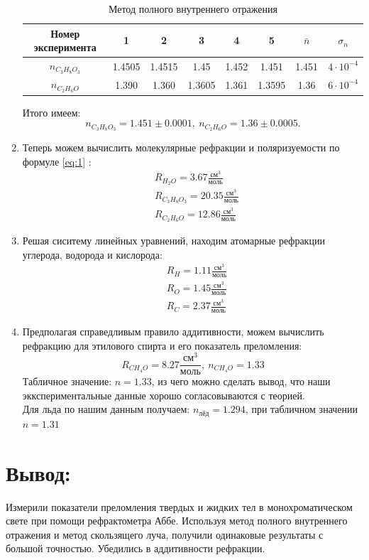 \documentclass[12pt]{article}
\begin{document}
\begin{enumerate}
    \begin{table}[h!]
        \centering
        \begin{tabular}{| c | c | c | c | c | c | c | c |} 
            \hline
            Номер эксперимента & 1 & 2 & 3 & 4 & 5 & $\bar{n}$ & $\sigma_n$ \\
            \hline
            $n_{C_3 H_8 O_3}$ & 1.4505 & 1.4515 & 1.45 & 1.452 & 1.451 &  1.451 & $4 \cdot 10^{-4}$ \\ 
            \hline
            $n_{C_2 H_6 O}$ & 1.390 & 1.360 & 1.3605 &  1.361  & 1.3595 & 1.36 & $6 \cdot 10^{-4}$ \\
            \hline
        \end{tabular}        
        \caption{Метод полного внутреннего отражения}
    \end{table}
    \newpage
    Итого имеем:
    \[ n_{C_3 H_8 O_3} = 1.451 \pm 0.0001, \ n_{C_2 H_6 O} = 1.36 \pm 0.0005. \]
    \item Теперь можем вычислить молекулярные рефракции и поляризуемости по формуле \eqref{eq:1} :
    \begin{align*}
        &R_{H_2 O} = 3.67 \frac{\text{см}^3}{\text{моль}} \\
        &R_{C_3 H_8 O_3} = 20.35 \frac{\text{см}^3}{\text{моль}} \\
        &R_{C_2 H_6 O} = 12.86 \frac{\text{см}^3}{\text{моль}}
    \end{align*}
    \item Решая сиситему линейных уравнений, находим атомарные рефракции углерода, водорода и кислорода: 
     \begin{align*}
        &R_{H} = 1.11 \frac{\text{см}^3}{\text{моль}} \\
        &R_{O} = 1.45 \frac{\text{см}^3}{\text{моль}} \\
        &R_{C} = 2.37 \frac{\text{см}^3}{\text{моль}}
    \end{align*}
    \item Предполагая справедливым правило аддитивности, можем вычислить рефракцию для этилового спирта и его показатель преломления:
    \[ R_{C H_4 O} = 8.27 \frac{\text{см}^3}{\text{моль}}, \ n_{C H_4 O}  = 1.33 \]
    Табличное значение: $n = 1.33$, из чего можно сделать вывод, что наши эккспериментальные данные хорошо согласовываются с теорией. \\
    Для льда по нашим данным получаем: $n_{\text{лёд}} = 1.294$, при табличном значении $n = 1.31$
\end{enumerate}

\section*{Вывод:} 
Измерили показатели преломления твердых и жидких тел в монохроматическом свете при помощи рефрактометра Аббе. Используя метод полного внутреннего отражения и метод скользящего луча, получили одинаковые результаты с большой точностью. Убедились в аддитивности рефракции.
\end{document}
